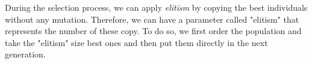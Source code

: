 \documentclass[12pt, openany]{article}
\begin{document}
During the selection process, we can apply \emph{elitism} by copying the best individuals without any mutation. Therefore, we can have a parameter called "elitism" that represents the number of these copy. To do so, we first order the population and take the "elitism" size best ones and then put them directly in the next generation.


\listoftables


\listoffigures


\listofalgorithms


\lstlistoflistings
\end{document}
